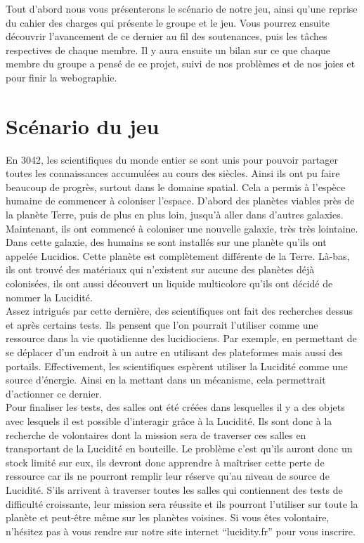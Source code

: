 \documentclass[a4paper , 12pt]{article}
\begin{document}
    Tout d’abord nous vous présenterons le scénario de notre jeu, ainsi qu’une reprise du cahier des charges qui présente le groupe et le jeu. Vous pourrez ensuite découvrir l’avancement de ce dernier au fil des soutenances, puis les tâches respectives de chaque membre. Il y aura ensuite un bilan sur ce que chaque membre du groupe a pensé de ce projet, suivi de nos problèmes et de nos joies et pour finir la webographie.



\quad

\newpage

\section{Scénario du jeu}

\quad

En 3042, les scientifiques du monde entier se sont unis pour pouvoir partager toutes les connaissances accumulées au cours des siècles. Ainsi ils ont pu faire beaucoup de progrès, surtout dans le domaine spatial. Cela a permis à l’espèce humaine de commencer à coloniser l’espace. D’abord des planètes viables près de la planète Terre, puis de plus en plus loin, jusqu’à aller dans d’autres galaxies. Maintenant, ils ont commencé à coloniser une nouvelle galaxie, très très lointaine. Dans cette galaxie, des humains se sont installés sur une planète qu’ils ont appelée Lucidios. Cette planète est complètement différente de la Terre. Là-bas, ils ont trouvé des matériaux qui n’existent sur aucune des planètes déjà colonisées, ils ont aussi découvert un liquide multicolore qu’ils ont décidé de nommer la Lucidité.\\

Assez intrigués par cette dernière, des scientifiques ont fait des recherches dessus et après certains tests. Ils pensent que l’on pourrait l’utiliser comme une ressource dans la vie quotidienne des lucidiociens. Par exemple, en permettant de se déplacer d’un endroit à un autre en utilisant des plateformes mais aussi des portails. Effectivement, les scientifiques espèrent utiliser la Lucidité comme une source d’énergie. Ainsi en la mettant dans un mécanisme, cela permettrait d’actionner ce dernier. \\

Pour finaliser les tests, des salles ont été créées dans lesquelles il y a des objets avec lesquels il est possible d’interagir grâce à la Lucidité. Ils sont donc à la recherche de volontaires dont la mission sera de traverser ces salles en transportant de la Lucidité en bouteille. Le problème c’est qu’ils auront donc un stock limité sur eux, ils devront donc apprendre à maîtriser cette perte de ressource car ils ne pourront remplir leur réserve qu’au niveau de source de Lucidité. S’ils arrivent à traverser toutes les salles qui contiennent  des tests de difficulté croissante, leur mission sera réussite et ils pourront l’utiliser sur toute la planète et peut-être même sur les planètes voisines. Si vous êtes volontaire, n’hésitez pas à vous rendre sur notre site internet “lucidity.fr” pour vous inscrire.
\end{document}
